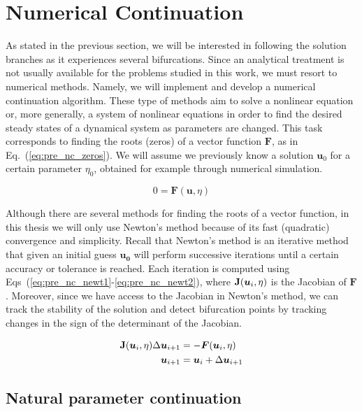 \chapter{Numerical Continuation}

As stated in the previous section, we will be interested in following the solution
branches as it experiences several bifurcations. Since an analytical treatment is not
usually available for the problems studied in this work, we must resort to numerical methods.
Namely, we will implement and develop a numerical continuation algorithm. These type of methods
aim to solve a nonlinear equation or, more generally, a system of nonlinear equations in order to find the desired steady states of a dynamical system 
as parameters are changed. This task corresponds to finding the roots (zeros) of a vector function $\bm{F}$, as in Eq.~(\ref{eq:pre_nc_zeros}). 
We will assume we previously know a solution $\bm{u}_0$ for a certain parameter $\eta_0$, obtained
for example through numerical simulation.

\begin{equation}
    0 = \bm{F}(\bm{u}, \eta)
    \label{eq:pre_nc_zeros}
\end{equation}

Although there are several methods for finding the roots of a vector function,
in this thesis we will only use Newton's method because of its fast (quadratic) convergence
and simplicity. Recall that Newton's method is an iterative method that given an initial
guess $\bm{u_0}$ will perform successive iterations until a certain accuracy or tolerance
is reached. Each iteration is computed using Eqs~(\ref{eq:pre_nc_newt1}-\ref{eq:pre_nc_newt2}),
where $\mathbf{J}(\bm{u}_i, \eta)$ is the Jacobian of $\bm{F}$. Moreover, since we have access
to the Jacobian in Newton's method, we can track the stability of the solution and detect bifurcation
points by tracking changes in the sign of the determinant of the Jacobian.

\begin{align}
    \mathbf{J}(\bm{u}_i, \eta) \Delta \bm{u}_{i+1} &= - \bm{F}(\bm{u}_i, \eta) 
    \label{eq:pre_nc_newt1}
    \\
    \bm{u}_{i+1} &= \bm{u}_i + \Delta \bm{u}_{i+1}
    \label{eq:pre_nc_newt2}
\end{align}

\section{Natural parameter continuation}


